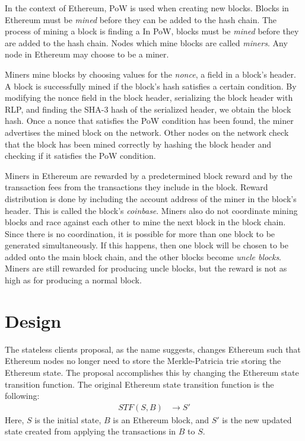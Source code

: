 \documentclass[12pt]{article}
\begin{document}
In the context of Ethereum, PoW is used when creating new blocks. Blocks in Ethereum must be \emph{mined} before they can be added to the hash chain. The process of mining a block is finding a
In PoW, blocks must be \emph{mined} before they are added to the hash chain. Nodes which mine blocks are called \emph{miners}. Any node in Ethereum may choose to be a miner.

Miners mine blocks by choosing values for the \emph{nonce}, a field in a block's header. A block is successfully mined if the block's hash satisfies a certain condition. By modifying the nonce field in the block header, serializing the block header with RLP, and finding the SHA-3 hash of the serialized header, we obtain the block hash. Once a nonce that satisfies the PoW condition has been found, the miner advertises the mined block on the network. Other nodes on the network check that the block has been mined correctly by hashing the block header and checking if it satisfies the PoW condition.

Miners in Ethereum are rewarded by a predetermined block reward and by the transaction fees from the transactions they include in the block. Reward distribution is done by including the account address of the miner in the block's header. This is called the block's \emph{coinbase}. Miners also do not coordinate mining blocks and race against each other to mine the next block in the block chain. Since there is no coordination, it is possible for more than one block to be generated simultaneously. If this happens, then one block will be chosen to be added onto the main block chain, and the other blocks become \emph{uncle blocks}. Miners are still rewarded for producing uncle blocks, but the reward is not as high as for producing a normal block.


\section{Design}

The stateless clients proposal, as the name suggests, changes Ethereum such that Ethereum nodes no longer need to store the Merkle-Patricia trie storing the Ethereum state. The proposal accomplishes this by changing the Ethereum state transition function. The original Ethereum state transition function is the following:
\begin{align*}
  STF(S, B) &\to S'
\end{align*}
Here, $S$ is the initial state, $B$ is an Ethereum block, and $S'$ is the new updated state created from applying the transactions in $B$ to $S$.
\end{document}
